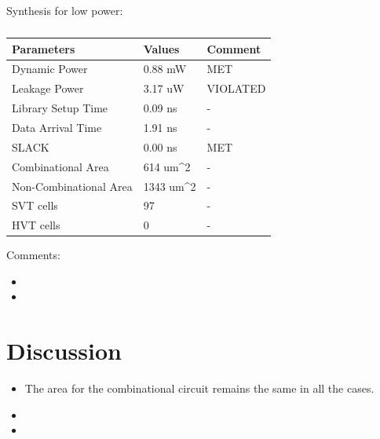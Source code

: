 \documentclass[11pt,a4paper]{article}
\begin{document}
Synthesis for low power:

\begin{table}[htbp]
\begin{center}
\begin{tabular}{|l|l|l|}
\hline
\textbf{Parameters}	& \textbf{Values}		& \textbf{Comment}\\ \hline
Dynamic Power				&	0.88 mW				& MET\\ \hline
Leakage Power 			&	3.17 uW				& VIOLATED\\ \hline
Library Setup Time  & 0.09 ns				& - \\ \hline
Data Arrival Time		& 1.91 ns				& - \\ \hline
SLACK								& 0.00 ns			& MET\\ \hline
Combinational Area	& 614 um^2			& - \\ \hline
Non-Combinational Area	& 1343 um^2	& - \\ \hline
SVT cells						& 97						& - \\ \hline
HVT cells						& 0							& - \\ \hline
\end{tabular}
\end{center}
\caption{}
\label{tab:syn2.0.2}
\end{table}

Comments:
\begin{itemize}
\item 
\item 
\end{itemize}


\section{Discussion}
\begin{itemize}
\item The area for the combinational circuit remains the same in all the cases. 
\item 
\item 
\end{itemize}
\end{document}
